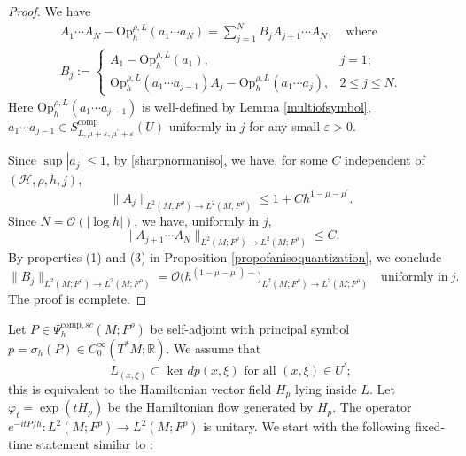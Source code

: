 \documentclass[11pt,oneside,reqno]{amsart}
\theoremstyle{definition}
\numberwithin{equation}{section}
\theoremstyle{plain}
\begin{document}
\begin{proof}
We have
\begin{equation}
\begin{gathered}
A_1 \cdots A_N-\mathrm{Op}_h^{\rho,L} (a_1 \cdots a_N )=\sum_{j=1}^N B_j A_{j+1} \cdots A_N, \quad \text{where} \\
B_j:= \begin{cases}A_1-\mathrm{Op}_h^{\rho,L}\left(a_1\right), & j=1 ; \\
\mathrm{Op}_h^{\rho,L} (a_1 \cdots a_{j-1} ) A_j-\mathrm{Op}_h^{\rho,L} (a_1 \cdots a_j ), & 2 \leq j \leq N .\end{cases}
\end{gathered}
\end{equation}
Here $\mathrm{Op}_h^{\rho,L}\left(a_1 \cdots a_{j-1}\right)$ is well-defined by Lemma \ref{multiofsymbol}, $a_1 \cdots a_{j-1} \in S_{L, \mu+\varepsilon, \mu^{\prime}+\varepsilon}^{\mathrm{comp}}(U)$ uniformly in $j$ for any small $\varepsilon>0$.

Since $\sup  |a_j | \leq 1$, by \eqref{sharpnormaniso}, we have, for some $C$ independent of $(\mathcal{H},\rho,h,j)$,
\begin{equation*}
 \|A_j \|_{L^2(M;F^\rho) \rightarrow L^2(M;F^\rho)} \leq 1+C h^{1-\mu-\mu^{\prime}}   .
\end{equation*}
Since $N=\mathcal{O}(|\log h|)$, we have, uniformly in $j$,
\begin{equation*}
     \|A_{j+1} \cdots A_N \|_{L^2(M;F^\rho) \rightarrow L^2(M;F^\rho)} \leq C .
\end{equation*}
By properties (1) and (3) in Proposition \ref{propofanisoquantization}, we conclude
\begin{equation*}
    \|B_j \|_{L^2(M;F^\rho) \rightarrow L^2(M;F^\rho)}=\mathcal{O} \big(h^{(1-\mu-\mu^{\prime})-} \big)_{L^2(M;F^\rho) \rightarrow L^2(M;F^\rho)} \quad \text{uniformly in} \ j.
\end{equation*}
The proof is complete.
\end{proof}
Let $P \in \Psi_h^{\mathrm{comp},sc}(M;F^\rho)$ be self-adjoint with principal symbol $p=\sigma_h(P) \in C_0^{\infty}\left(T^* M ; \mathbb{R}\right)$. We assume that
\begin{equation}\label{conditionoffoliation}
L_{(x, \xi)} \subset \operatorname{ker} d p(x, \xi) \text { for all }(x, \xi) \in U^{\prime} ;
\end{equation}
this is equivalent to the Hamiltonian vector field $H_p$ lying inside $L$. Let $\varphi_{t}=\exp(tH_{p})$ be the Hamiltonian flow generated by $H_{p}$. The operator $e^{-i t P / h}: L^2(M;F^\rho) \rightarrow L^2(M;F^{\rho})$ is unitary. We start with the following fixed-time statement similar to \cite[Lemma 3.17]{dyatlovzahl2016spectral}:
\end{document}
